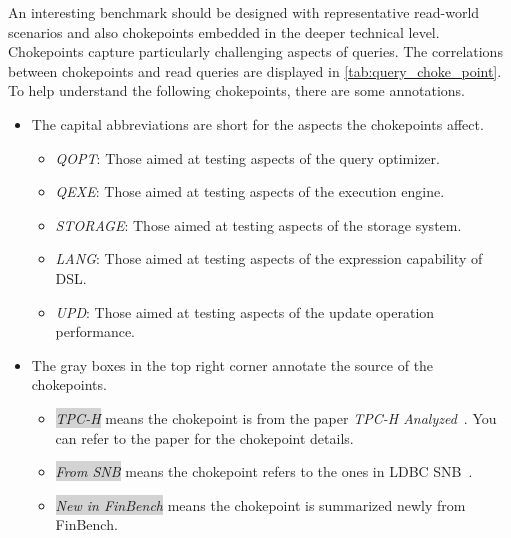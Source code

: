 An interesting benchmark should be designed with representative read-world
scenarios and also chokepoints embedded in the deeper technical level.
Chokepoints capture particularly challenging aspects of queries. The
correlations between chokepoints and read queries are displayed in
\autoref{tab:query_choke_point}. To help understand the following chokepoints,
there are some annotations.
\begin{itemize}
    \item The capital abbreviations are short for the aspects the chokepoints
          affect. \begin{itemize}
              \item \emph{QOPT}: Those aimed at testing aspects of the query
                    optimizer.
              \item \emph{QEXE}: Those aimed at testing aspects of the execution
                    engine.
              \item \emph{STORAGE}: Those aimed at testing aspects of the
                    storage system.
              \item \emph{LANG}: Those aimed at testing aspects of the
                    expression capability of DSL.
              \item \emph{UPD}: Those aimed at testing aspects of the update
                    operation performance.
          \end{itemize}
    \item The gray boxes in the top right corner annotate the source of the
          chokepoints. \begin{itemize}
              \item \colorbox{lightgray}{\emph{TPC-H}} means the chokepoint is
                    from the paper \emph{TPC-H
                    Analyzed}~\cite{DBLP:conf/tpctc/BonczNE13}. You can refer to
                    the paper for the chokepoint details.
              \item \colorbox{lightgray}{\emph{From SNB}} means the chokepoint
                    refers to the ones in LDBC SNB~\cite{ldbc_snb_docs}.
              \item \colorbox{lightgray}{\emph{New in FinBench}} means the
                    chokepoint is summarized newly from FinBench.
          \end{itemize}
\end{itemize}



